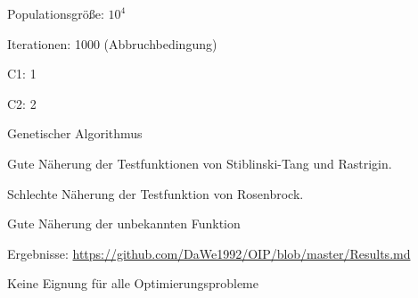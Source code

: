 \documentclass[t,8pt]{beamer}
\begin{document}

\begin{dwFrame}

\end{dwFrame}



\begin{dwFrame}

	\begin{dwItemize}
		\item Populationsgröße: $10^{4}$
		\item Iterationen: 1000 (Abbruchbedingung)
		\item C1: 1
		\item C2: 2
	\end{dwItemize}

\end{dwFrame}



\begin{dwHeaderFrame}{Genetischer Algorithmus}
	\begin{dwItemize}
		\item Gute Näherung der Testfunktionen von Stiblinski-Tang und Rastrigin.
		\item Schlechte Näherung der Testfunktion von Rosenbrock.
		\item Gute Näherung der unbekannten Funktion
		\item Ergebnisse: \url{https://github.com/DaWe1992/OIP/blob/master/Results.md}
		\item Keine Eignung für alle Optimierungsprobleme
	\end{dwItemize}
\end{dwHeaderFrame}
\end{document}

